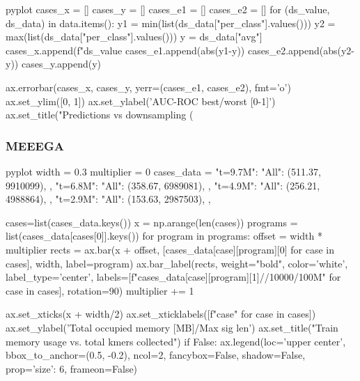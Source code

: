 \begin{frame}[fragile]
\begin{CacheMeCode}{pyplot}
    cases_x = []
    cases_y = []
    cases_e1 = []
    cases_e2 = []
    for (ds_value, ds_data) in data.items():
        y1 = min(list(ds_data["per_class"].values()))
        y2 = max(list(ds_data["per_class"].values()))
        y = ds_data["avg"]
        cases_x.append(f"{ds_value}%
        cases_e1.append(abs(y1-y))
        cases_e2.append(abs(y2-y))
        cases_y.append(y)

    ax.errorbar(cases_x, cases_y, yerr=(cases_e1, cases_e2), fmt='o')
    ax.set_ylim([0, 1])
    ax.set_ylabel('AUC-ROC best/worst [0-1]')
    ax.set_title("Predictions vs downsampling (%
  \end{CacheMeCode}
\end{frame}


\begin{frame}[fragile]
  \frametitle{MEEEGA}

  \begin{CacheMeCode}{pyplot}
    width = 0.3
    multiplier = 0
    cases_data = {
      "t=9.7M": {
        "All": (511.37, 9910099),
      },
      "t=6.8M": {                                                                                                                                                                                                                               
        "All": (358.67, 6989081),                                                                                                                                                                                                         
      },
      "t=4.9M": {
        "All": (256.21, 4988864),
      },
      "t=2.9M": {
        "All": (153.63, 2987503),
      },
    }

    cases=list(cases_data.keys())
    x = np.arange(len(cases))
    programs = list(cases_data[cases[0]].keys())
    for program in programs:
      offset = width * multiplier
      rects = ax.bar(x + offset, [cases_data[case][program][0] for case in cases], width, label=program)
      ax.bar_label(rects, weight="bold", color='white', label_type='center', labels=[f"{cases_data[case][program][1]//10000/100}M" for case in cases], rotation=90)
      multiplier += 1

    ax.set_xticks(x + width/2)
    ax.set_xticklabels([f"{case}" for case in cases])
    ax.set_ylabel('Total occupied memory [MB]/Max sig len')
    ax.set_title("Train memory usage vs. total kmers collected")
    if False:
      ax.legend(loc='upper center', bbox_to_anchor=(0.5, -0.2),
          ncol=2, fancybox=False, shadow=False, prop={'size': 6}, frameon=False)
  \end{CacheMeCode}
\end{frame}

